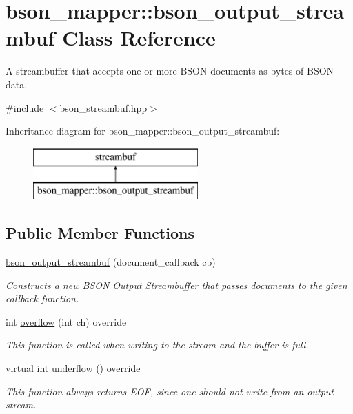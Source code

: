 \hypertarget{classbson__mapper_1_1bson__output__streambuf}{}\section{bson\+\_\+mapper\+:\+:bson\+\_\+output\+\_\+streambuf Class Reference}
\label{classbson__mapper_1_1bson__output__streambuf}


A streambuffer that accepts one or more B\+S\+ON documents as bytes of B\+S\+ON data.  




{\ttfamily \#include $<$bson\+\_\+streambuf.\+hpp$>$}

Inheritance diagram for bson\+\_\+mapper\+:\+:bson\+\_\+output\+\_\+streambuf\+:\begin{figure}[H]
\begin{center}
\leavevmode
\includegraphics[height=2.000000cm]{classbson__mapper_1_1bson__output__streambuf}
\end{center}
\end{figure}
\subsection*{Public Member Functions}
\begin{DoxyCompactItemize}
\item 
\hyperlink{classbson__mapper_1_1bson__output__streambuf_afbbff25db476b5ec8c166a030664579a}{bson\+\_\+output\+\_\+streambuf} (document\+\_\+callback cb)
\begin{DoxyCompactList}\small\item\em Constructs a new B\+S\+ON Output Streambuffer that passes documents to the given callback function. \end{DoxyCompactList}\item 
int \hyperlink{classbson__mapper_1_1bson__output__streambuf_aebf518d6dd7cad563dced7299b05456e}{overflow} (int ch) override
\begin{DoxyCompactList}\small\item\em This function is called when writing to the stream and the buffer is full. \end{DoxyCompactList}\item 
virtual int \hyperlink{classbson__mapper_1_1bson__output__streambuf_abf1753938d33b31f2408967589ca64ee}{underflow} () override
\begin{DoxyCompactList}\small\item\em This function always returns E\+OF, since one should not write from an output stream. \end{DoxyCompactList}\end{DoxyCompactItemize}


